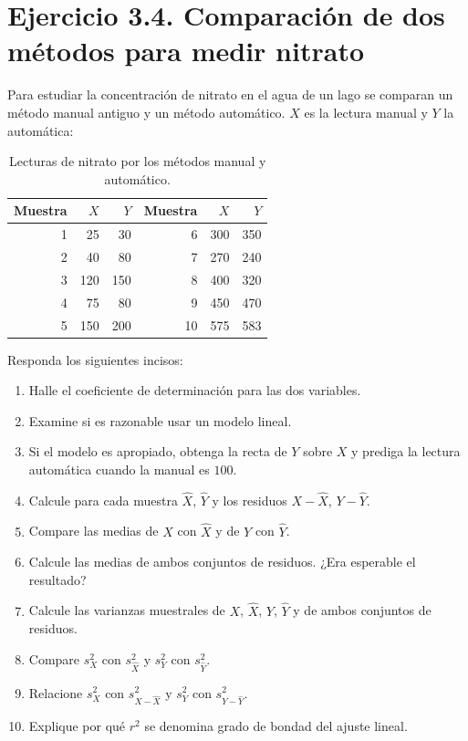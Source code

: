 \section{Ejercicio 3.4. Comparación de dos métodos para medir nitrato}

Para estudiar la concentración de nitrato en el agua de un lago se comparan un método manual antiguo y un método automático. $X$ es la lectura manual y $Y$ la automática:

\begin{table}[H]
\centering
\small
\begin{tabular}{r|rr@{\qquad}r|rr}
Muestra & $X$ & $Y$ & Muestra & $X$ & $Y$ \\ \hline
1 & 25 & 30 & 6 & 300 & 350 \\
2 & 40 & 80 & 7 & 270 & 240 \\
3 & 120 & 150 & 8 & 400 & 320 \\
4 & 75 & 80 & 9 & 450 & 470 \\
5 & 150 & 200 & 10 & 575 & 583 \\
\end{tabular}
\caption{Lecturas de nitrato por los métodos manual y automático.}
\label{tab:clase5-metodos-datos}
\end{table}

Responda los siguientes incisos:
\begin{enumerate}
    \item[\textbf{a)}] Halle el coeficiente de determinación para las dos variables.
    \item[\textbf{b)}] Examine si es razonable usar un modelo lineal.
    \item[\textbf{c)}] Si el modelo es apropiado, obtenga la recta de $Y$ sobre $X$ y prediga la lectura automática cuando la manual es $100$.
    \item[\textbf{d)}] Calcule para cada muestra $\widehat X$, $\widehat Y$ y los residuos $X-\widehat X$, $Y-\widehat Y$.
    \item[\textbf{e)}] Compare las medias de $X$ con $\widehat X$ y de $Y$ con $\widehat Y$.
    \item[\textbf{f)}] Calcule las medias de ambos conjuntos de residuos. ¿Era esperable el resultado?
    \item[\textbf{g)}] Calcule las varianzas muestrales de $X$, $\widehat X$, $Y$, $\widehat Y$ y de ambos conjuntos de residuos.
    \item[\textbf{h)}] Compare $s_X^2$ con $s_{\widehat X}^2$ y $s_Y^2$ con $s_{\widehat Y}^2$.
    \item[\textbf{i)}] Relacione $s_X^2$ con $s_{X-\widehat X}^2$ y $s_Y^2$ con $s_{Y-\widehat Y}^2$.
    \item[\textbf{j)}] Explique por qué $r^2$ se denomina grado de bondad del ajuste lineal.
\end{enumerate}

